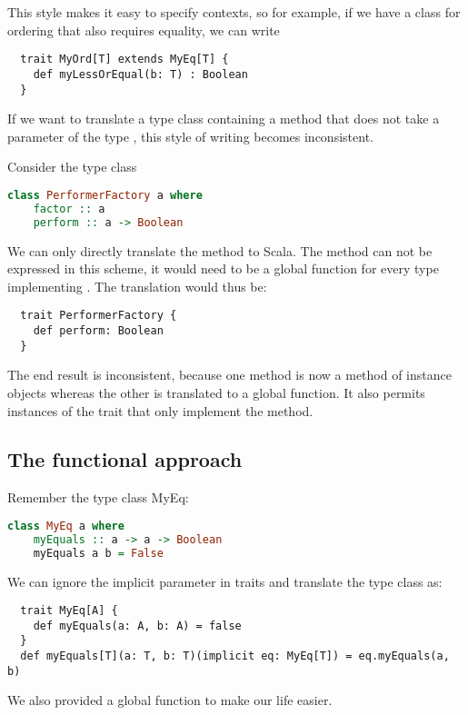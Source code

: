 This style makes it easy to specify contexts, so for example, if we have
a class  for ordering that also requires equality, we can write
\begin{lstlisting}
  trait MyOrd[T] extends MyEq[T] {
    def myLessOrEqual(b: T) : Boolean
  }
\end{lstlisting}

If we want to translate a type class containing a method that does not take a
parameter of the type , this style of writing becomes inconsistent.

\begin{example} Consider the type class
\begin{lstlisting}[language=Haskell]
  class PerformerFactory a where
    factor :: a
    perform :: a -> Boolean
\end{lstlisting}
We can only directly translate the  method to Scala. The 
method can not be expressed in this scheme, it would need to be a global
function for every type implementing . The translation
would thus be:
\begin{lstlisting}
  trait PerformerFactory {
    def perform: Boolean
  }
\end{lstlisting}
The end result is inconsistent, because one method is now a method of
instance objects whereas the other is translated to a global function. It
also permits instances of the trait that only implement the 
method.
\end{example}
\subsection{The functional approach}
Remember the type class MyEq:
\begin{lstlisting}[language=Haskell]
  class MyEq a where
    myEquals :: a -> a -> Boolean
    myEquals a b = False
\end{lstlisting}
We can ignore the implicit  parameter in traits and translate the type
class as:
\begin{lstlisting}
  trait MyEq[A] {
    def myEquals(a: A, b: A) = false
  }
  def myEquals[T](a: T, b: T)(implicit eq: MyEq[T]) = eq.myEquals(a, b)
\end{lstlisting}
We also provided a global  function to make our life easier.

